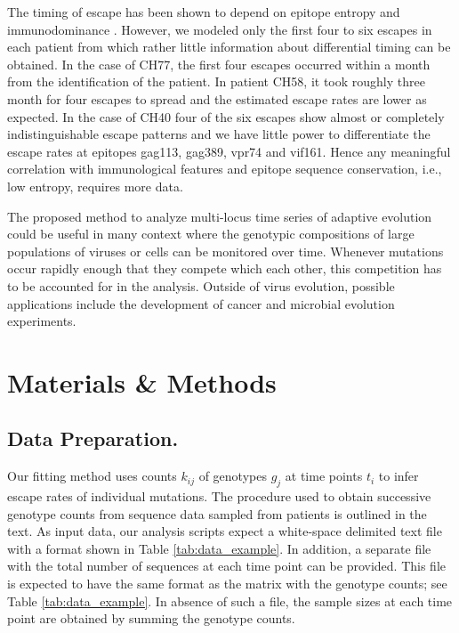 \documentclass{frontiers}
\newcommand{\gt}{g}
\begin{document}
The timing of escape has been shown to depend on epitope entropy
and immunodominance \citep{liu_vertical_2013}. However, we modeled only
the first four to six escapes in each patient from which rather little
information about differential timing can be obtained. In the case of
CH77, the first four escapes occurred within a month from the
identification of the patient. In patient CH58, it took roughly three
month for four escapes to spread and the estimated escape rates are
lower as expected. In the case of CH40 four of the six escapes show
almost or completely indistinguishable escape patterns and we have
little power to differentiate the escape rates at epitopes gag113,
gag389, vpr74 and vif161. Hence any meaningful correlation with
immunological features and epitope sequence conservation, i.e.,
low entropy, requires more data.

The proposed method to analyze multi-locus time series of adaptive
evolution could be useful in many context where the genotypic
compositions of large populations of viruses or cells can be
monitored over time. Whenever mutations occur rapidly enough that they
compete which each other, this competition has to be accounted for in the
analysis. Outside of virus evolution, possible applications include
the development of cancer and microbial evolution experiments. 


\section{Materials \& Methods}

\subsection{Data Preparation.} 
Our fitting method uses counts $k_{ij}$ of genotypes $\gt_j$ at time
points $t_i$ to infer escape rates of individual mutations. The
procedure used to obtain successive genotype counts from sequence data
sampled from patients is outlined in the text. As input data, our
analysis scripts expect a white-space delimited text file with a format
shown in Table \ref{tab:data_example}. In addition, a separate file with
the total number of sequences at each time point can be provided. This
file is expected to have the same format as the matrix with the genotype
counts; see Table \ref{tab:data_example}. In absence of such a file, the
sample sizes at each time point are obtained by summing the genotype
counts.
\end{document}
